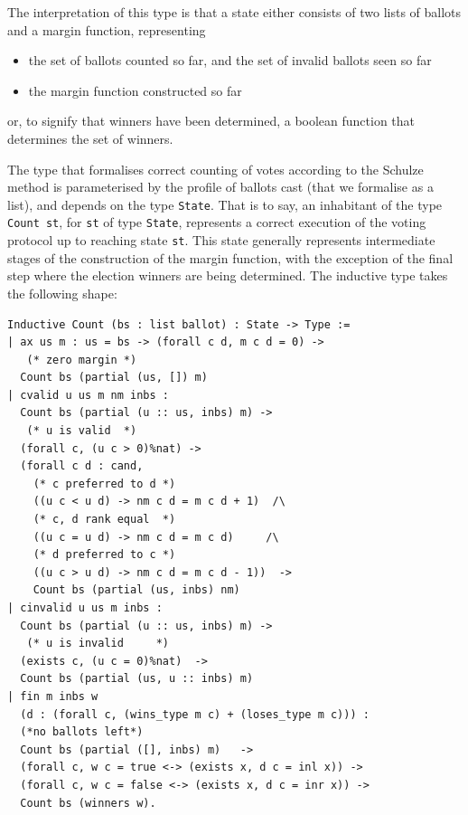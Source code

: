 \noindent
The interpretation of this type is that a state either consists of
two lists of ballots and a margin function, representing

\begin{itemize}
  \item the set of ballots counted so far, and the set of invalid
ballots seen so far
  \item the margin function constructed so far
\end{itemize}
or, to signify that winners have been determined, a boolean function
that determines the set of winners.

The type that formalises correct counting of votes according to the
Schulze method is parameterised by the profile of ballots cast (that
we formalise as a list), and depends on the type \texttt{State}. That
is to say, an inhabitant of the type \texttt{Count st}, for
\texttt{st} of type \texttt{State}, represents a correct execution of
the voting protocol up to reaching state \texttt{st}. This
state generally represents intermediate stages of the construction
of the margin function, with the exception of the final step where
the election winners are being determined. The inductive type takes
the following shape:

\begin{verbatim}
Inductive Count (bs : list ballot) : State -> Type :=
| ax us m : us = bs -> (forall c d, m c d = 0) -> 
   (* zero margin *)
  Count bs (partial (us, []) m) 
| cvalid u us m nm inbs : 
  Count bs (partial (u :: us, inbs) m) -> 
   (* u is valid  *)
  (forall c, (u c > 0)%nat) ->         
  (forall c d : cand, 
    (* c preferred to d *)
    ((u c < u d) -> nm c d = m c d + 1)  /\
    (* c, d rank equal  *)
    ((u c = u d) -> nm c d = m c d)     /\
    (* d preferred to c *)
    ((u c > u d) -> nm c d = m c d - 1))  ->
    Count bs (partial (us, inbs) nm)
| cinvalid u us m inbs : 
  Count bs (partial (u :: us, inbs) m) ->
   (* u is invalid     *)  
  (exists c, (u c = 0)%nat)  ->
  Count bs (partial (us, u :: inbs) m)
| fin m inbs w 
  (d : (forall c, (wins_type m c) + (loses_type m c))) :
  (*no ballots left*)
  Count bs (partial ([], inbs) m)   ->
  (forall c, w c = true <-> (exists x, d c = inl x)) ->
  (forall c, w c = false <-> (exists x, d c = inr x)) ->
  Count bs (winners w).
 
\end{verbatim}

